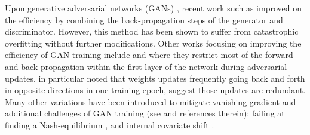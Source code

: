 








Upon generative adversarial networks (GANs) \citep{GoodfellowAdversarial, madry2018towards, kurakin2017adversarial}, recent work such as \citet{shafahi2019adversarial} improved on the efficiency by combining the back-propagation steps of the generator and discriminator. However, this method has been shown to suffer from catastrophic overfitting \citep{andriushchenko2020understanding, kim2021understanding} without further modifications. Other works focusing on improving the efficiency of GAN training include \citet{Wong2020Fast} and \citet{NEURIPS2019_812b4ba2} where they restrict most of the forward and back propagation within the first layer of the network during adversarial updates. \citet{zhang2021free} in particular noted that weights updates frequently going back and forth in opposite directions in one training epoch, suggest those updates are redundant.
Many other variations have been introduced to mitigate vanishing gradient and additional challenges of GAN training (see \citet{jabbar2021survey} and references therein): failing at finding a Nash-equilibrium \citep{ratliff2016characterization}, and internal
covariate shift \citep{ioffe2015batch}.


